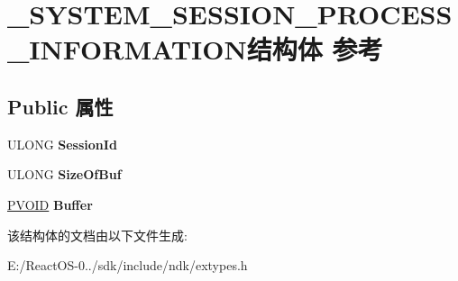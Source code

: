 \hypertarget{struct___s_y_s_t_e_m___s_e_s_s_i_o_n___p_r_o_c_e_s_s___i_n_f_o_r_m_a_t_i_o_n}{}\section{\+\_\+\+S\+Y\+S\+T\+E\+M\+\_\+\+S\+E\+S\+S\+I\+O\+N\+\_\+\+P\+R\+O\+C\+E\+S\+S\+\_\+\+I\+N\+F\+O\+R\+M\+A\+T\+I\+O\+N结构体 参考}
\label{struct___s_y_s_t_e_m___s_e_s_s_i_o_n___p_r_o_c_e_s_s___i_n_f_o_r_m_a_t_i_o_n}
\subsection*{Public 属性}
\begin{DoxyCompactItemize}
\item 
\mbox{\label{struct___s_y_s_t_e_m___s_e_s_s_i_o_n___p_r_o_c_e_s_s___i_n_f_o_r_m_a_t_i_o_n_a24efef25240dee7ba1943ff77e00b671}} 
U\+L\+O\+NG {\bfseries Session\+Id}
\item 
\mbox{\label{struct___s_y_s_t_e_m___s_e_s_s_i_o_n___p_r_o_c_e_s_s___i_n_f_o_r_m_a_t_i_o_n_aa86eacaedb0b35e3d29ce2c1ba96270b}} 
U\+L\+O\+NG {\bfseries Size\+Of\+Buf}
\item 
\mbox{\label{struct___s_y_s_t_e_m___s_e_s_s_i_o_n___p_r_o_c_e_s_s___i_n_f_o_r_m_a_t_i_o_n_aebefbe6f8b2be5273e604ba6537bcf01}} 
\hyperlink{interfacevoid}{P\+V\+O\+ID} {\bfseries Buffer}
\end{DoxyCompactItemize}


该结构体的文档由以下文件生成\+:\begin{DoxyCompactItemize}
\item 
E\+:/\+React\+O\+S-\/0../sdk/include/ndk/extypes.\+h\end{DoxyCompactItemize}
